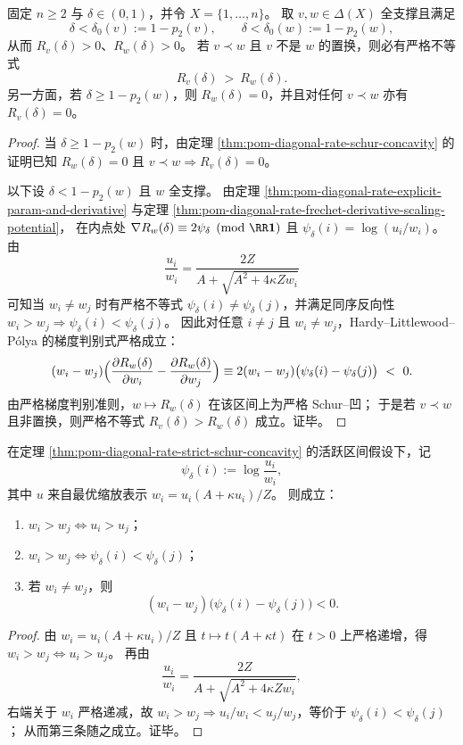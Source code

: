 \begin{theorem}\label{thm:pom-diagonal-rate-strict-schur-concavity}
固定 \(n\ge 2\) 与 \(\delta\in(0,1)\)，并令 \(X=\{1,\dots,n\}\)。
取 \(v,w\in\Delta(X)\) 全支撑且满足
\[
\delta<\delta_0(v):=1-p_2(v),
\qquad
\delta<\delta_0(w):=1-p_2(w),
\]
从而 \(R_v(\delta)>0\)、\(R_w(\delta)>0\)。
若 \(v\prec w\) 且 \(v\) 不是 \(w\) 的置换，则必有严格不等式
\[
R_v(\delta)\ >\ R_w(\delta).
\]
另一方面，若 \(\delta\ge 1-p_2(w)\)，则 \(R_w(\delta)=0\)，并且对任何 \(v\prec w\) 亦有 \(R_v(\delta)=0\)。
\end{theorem}
\begin{proof}
当 \(\delta\ge 1-p_2(w)\) 时，由定理 \ref{thm:pom-diagonal-rate-schur-concavity} 的证明已知 \(R_w(\delta)=0\) 且 \(v\prec w\Rightarrow R_v(\delta)=0\)。
\par
以下设 \(\delta<1-p_2(w)\) 且 \(w\) 全支撑。
由定理 \ref{thm:pom-diagonal-rate-explicit-param-and-derivative} 与定理 \ref{thm:pom-diagonal-rate-frechet-derivative-scaling-potential}，
在内点处
\(
\nabla R_w(\delta)\equiv 2\psi_\delta\pmod{\RR\mathbf 1}
\)
且 \(\psi_\delta(i)=\log(u_i/w_i)\)。
由
\[
\frac{u_i}{w_i}=\frac{2Z}{A+\sqrt{A^2+4\kappa Zw_i}}
\]
可知当 \(w_i\ne w_j\) 时有严格不等式 \(\psi_\delta(i)\ne \psi_\delta(j)\)，并满足同序反向性 \(w_i>w_j\Rightarrow \psi_\delta(i)<\psi_\delta(j)\)。
因此对任意 \(i\ne j\) 且 \(w_i\ne w_j\)，Hardy--Littlewood--P\'olya 的梯度判别式严格成立：
\[
(w_i-w_j)\Bigl(\frac{\partial R_w(\delta)}{\partial w_i}-\frac{\partial R_w(\delta)}{\partial w_j}\Bigr)
\equiv 2(w_i-w_j)\bigl(\psi_\delta(i)-\psi_\delta(j)\bigr)\ <\ 0.
\]
由严格梯度判别准则，\(w\mapsto R_w(\delta)\) 在该区间上为严格 Schur--凹；
于是若 \(v\prec w\) 且非置换，则严格不等式 \(R_v(\delta)>R_w(\delta)\) 成立。证毕。
\end{proof}

\begin{proposition}[最优对偶势对权重的严格反单调性]\label{prop:pom-diagonal-rate-dual-potential-reverse-order}
在定理 \ref{thm:pom-diagonal-rate-strict-schur-concavity} 的活跃区间假设下，记
\[
\psi_\delta(i):=\log\frac{u_i}{w_i},
\]
其中 \(u\) 来自最优缩放表示
\(
w_i=u_i(A+\kappa u_i)/Z
\)。
则成立：
\begin{enumerate}
\item \(w_i>w_j\iff u_i>u_j\)；
\item \(w_i>w_j\iff \psi_\delta(i)<\psi_\delta(j)\)；
\item 若 \(w_i\ne w_j\)，则
\[
(w_i-w_j)\bigl(\psi_\delta(i)-\psi_\delta(j)\bigr)<0.
\]
\end{enumerate}
\end{proposition}
\begin{proof}
由
\(
w_i=u_i(A+\kappa u_i)/Z
\)
且 \(t\mapsto t(A+\kappa t)\) 在 \(t>0\) 上严格递增，得 \(w_i>w_j\iff u_i>u_j\)。
再由
\[
\frac{u_i}{w_i}=\frac{2Z}{A+\sqrt{A^2+4\kappa Zw_i}},
\]
右端关于 \(w_i\) 严格递减，故 \(w_i>w_j\Rightarrow u_i/w_i<u_j/w_j\)，等价于
\(\psi_\delta(i)<\psi_\delta(j)\)；
从而第三条随之成立。证毕。
\end{proof}

